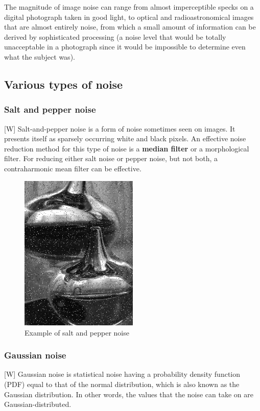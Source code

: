 \documentclass[12pt]{article}
\begin{document}
	The magnitude of image noise can range from almost imperceptible specks on a digital 
	photograph taken in good light, to optical and radioastronomical images that are almost 
	entirely noise, from which a small amount of information can be derived by sophisticated 
	processing (a noise level that would be totally unacceptable in a photograph since it 
	would be impossible to determine even what the subject was).
	
	\subsection{Various types of noise}
	
	\subsubsection{Salt and pepper noise}
	[W] Salt-and-pepper noise is a form of noise sometimes seen on images. It presents itself as 
	sparsely occurring white and black pixels. An effective noise reduction method for this 
	type of noise is a \textbf{median filter} or a morphological filter. For reducing either salt 
	noise or pepper noise, but not both, a contraharmonic mean filter can be effective.
	\begin{figure}[h!]
		\centering
		\includegraphics[width=0.5\textwidth]{img/Noise_salt_and_pepper.png}
		\caption{Example of salt and pepper noise}		
		\label{fig:salt_and_pepper}
	\end{figure}
	
	\subsubsection{Gaussian noise}
	[W] Gaussian noise is statistical noise having a probability density function (PDF) equal to 
	that of the normal distribution, which is also known as the Gaussian distribution. In other
	words, the values that the noise can take on are Gaussian-distributed.
	
\end{document}
